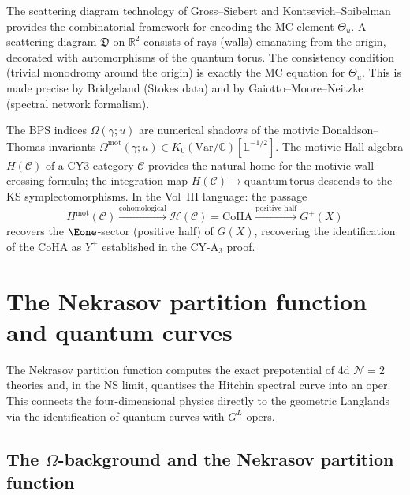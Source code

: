 \begin{remark}
\label{rem:phys-scattering-diagrams}
The scattering diagram technology of Gross--Siebert and Kontsevich--Soibelman
provides the combinatorial framework for encoding the MC element $\Theta_u$. A
scattering diagram $\mathfrak{D}$ on $\mathbb{R}^2$ consists of rays (walls)
emanating from the origin, decorated with automorphisms of the quantum torus.
The consistency condition (trivial monodromy around the origin) is exactly the
MC equation for $\Theta_u$. This is made precise by Bridgeland (Stokes data)
and by Gaiotto--Moore--Neitzke (spectral network formalism).
\end{remark}

\begin{remark}
\label{rem:phys-motivic-dt}
The BPS indices $\Omega(\gamma; u)$ are numerical shadows of the motivic
Donaldson--Thomas invariants $\Omega^{\mathrm{mot}}(\gamma; u) \in K_0(\mathrm{Var}/\mathbb{C})[\mathbb{L}^{-1/2}]$. The motivic Hall algebra $H(\mathcal{C})$
of a CY3 category $\mathcal{C}$ provides the natural home for the motivic
wall-crossing formula; the integration map
$H(\mathcal{C}) \to \mathrm{quantum\, torus}$ descends to the KS symplectomorphisms.
In the Vol~III language: the passage
\[
 H^{\mathrm{mot}}(\mathcal{C}) \xrightarrow{\text{cohomological}} \mathcal{H}(\mathcal{C}) = \mathrm{CoHA} \xrightarrow{\text{positive half}} G^+(X)
\]
recovers the $\Eone$-sector (positive half) of $G(X)$, recovering the
identification of the CoHA as $Y^+$ established in the CY-A$_3$ proof.
\end{remark}


\section{The Nekrasov partition function and quantum curves}
\label{sec:phys-nekrasov-quantum-curves}

The Nekrasov partition function computes the exact prepotential of 4d
$\mathcal{N}=2$ theories and, in the NS limit, quantises the Hitchin spectral
curve into an oper. This connects the four-dimensional physics directly to the
geometric Langlands via the identification of quantum curves with
$G^L$-opers.

\subsection{The \texorpdfstring{$\Omega$}{Omega}-background and the Nekrasov partition function}
\label{subsec:phys-omega-background}

